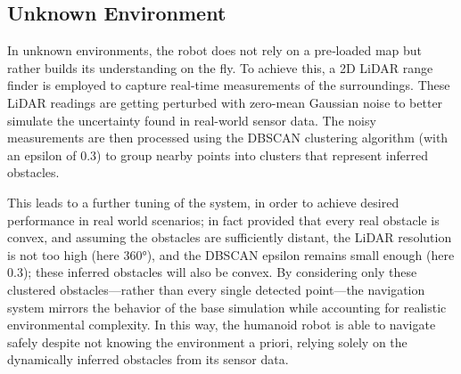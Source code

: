 \subsection{Unknown Environment}
In unknown environments, the robot does not rely on a pre‐loaded map but rather builds its understanding on the fly.
To achieve this, a 2D LiDAR range finder is employed to capture real-time measurements of the surroundings.
 These LiDAR readings are getting perturbed with zero-mean Gaussian noise to better simulate the uncertainty found in real-world sensor data.
The noisy measurements are then processed using the DBSCAN clustering algorithm (with  an epsilon of 0.3) to group nearby points into clusters that represent inferred obstacles.

This leads to a further tuning of the system, in order to achieve desired performance in real world scenarios; 
in fact provided that every real obstacle is convex, and assuming the
obstacles are sufficiently distant, the LiDAR resolution is not too high (here 360°), and the DBSCAN epsilon
remains small enough (here 0.3); these inferred obstacles will also be convex.
By considering only these clustered obstacles—rather than every single detected point—the navigation system mirrors the behavior of the base simulation while accounting for realistic environmental complexity.
 In this way, the humanoid robot is able to navigate safely despite not knowing the environment a priori, relying solely on the  dynamically inferred obstacles from its sensor data.





